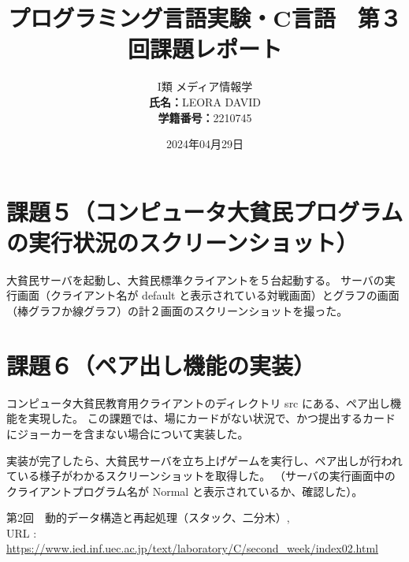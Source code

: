 \documentclass[]{jsarticle}
\title{\vspace{-3cm} プログラミング言語実験・C言語　第３回課題レポート}
\author{I類 メディア情報学 \\\textbf{氏名：}LEORA DAVID\\\textbf{学籍番号：}2210745}
\date{2024年04月29日}
\begin{document}
\maketitle
\section*{課題５（コンピュータ大貧民プログラムの実行状況のスクリーンショット）}
大貧民サーバを起動し、大貧民標準クライアントを５台起動する。
サーバの実行画面（クライアント名が default と表示されている対戦画面）とグラフの画面（棒グラフか線グラフ）の計２画面のスクリーンショットを撮った。

\newpage
\section*{課題６（ペア出し機能の実装）}
コンピュータ大貧民教育用クライアントのディレクトリ src にある、ペア出し機能を実現した。
この課題では、場にカードがない状況で、かつ提出するカードにジョーカーを含まない場合について実装した。

実装が完了したら、大貧民サーバを立ち上げゲームを実行し、ペア出しが行われている様子がわかるスクリーンショットを取得した。
（サーバの実行画面中のクライアントプログラム名が Normal と表示されているか、確認した）。

\newpage
\begin{thebibliography}{99}
   第2回　動的データ構造と再起処理（スタック、二分木）, \\URL : \url{https://www.ied.inf.uec.ac.jp/text/laboratory/C/second_week/index02.html}
\end{thebibliography}
\end{document}
